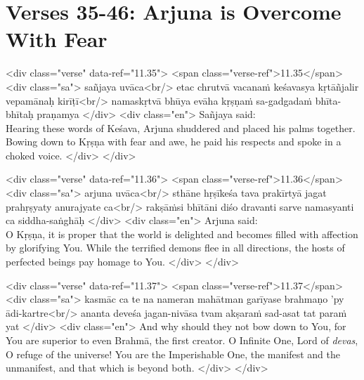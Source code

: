 \newpage
\section{Verses 35-46: Arjuna is Overcome With Fear}\label{sec-verses-35-46-arjuna-is-overcome-with-fear}


\begin{html}
<div class="verse" data-ref="11.35">
  <span class="verse-ref">11.35</span>
  <div class="sa">
    sañjaya uvāca<br/>
    etac chrutvā vacanaṁ keśavasya kṛtāñjalir vepamānaḥ kirīṭī<br/>
    namaskṛtvā bhūya evāha kṛṣṇaṁ sa-gadgadaṁ bhīta-bhītaḥ praṇamya
  </div>
  <div class="en">
    \hspace*{1em}Sañjaya said: \\ Hearing these words of Keśava, Arjuna shuddered and placed his palms together. Bowing down to Kṛṣṇa with fear and awe, he paid his respects and spoke in a choked voice.
  </div>
</div>
\end{html}



\begin{html}
<div class="verse" data-ref="11.36">
  <span class="verse-ref">11.36</span>
  <div class="sa">
    arjuna uvāca<br/>
    sthāne hṛṣīkeśa tava prakīrtyā jagat prahṛṣyaty anurajyate ca<br/>
    rakṣāṁsi bhītāni diśo dravanti sarve namasyanti ca siddha-saṅghāḥ
  </div>
  <div class="en">
    \hspace*{1em}Arjuna said: \\ O Kṛṣṇa, it is proper that the world is delighted and becomes filled with affection by glorifying You. While the terrified demons flee in all directions, the hosts of perfected beings pay homage to You.
  </div>
</div>
\end{html}



\begin{html}
<div class="verse" data-ref="11.37">
  <span class="verse-ref">11.37</span>
  <div class="sa">
    kasmāc ca te na nameran mahātman garīyase brahmaṇo ’py ādi-kartre<br/>
    ananta deveśa jagan-nivāsa tvam akṣaraṁ sad-asat tat paraṁ yat
  </div>
  <div class="en">
    And why should they not bow down to You, for You are superior to even Brahmā, the first creator. O Infinite One, Lord of \textit{devas}, O refuge of the universe! You are the Imperishable One, the manifest and the unmanifest, and that which is beyond both.
  </div>
</div>
\end{html}




